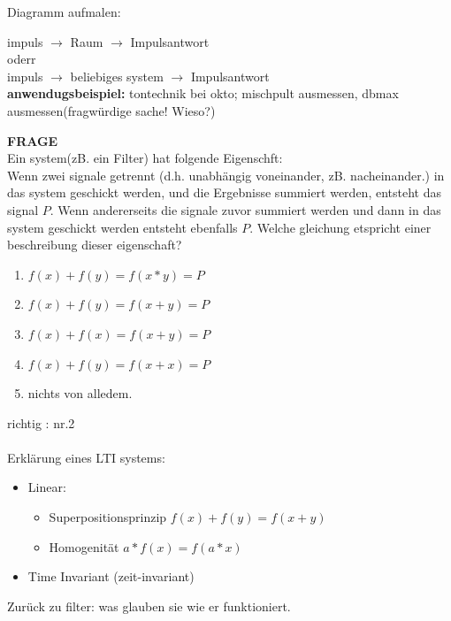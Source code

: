 Diagramm aufmalen:

impuls \(\rightarrow\) Raum \(\rightarrow\) Impulsantwort\\
oderr \\
impuls \(\rightarrow\) beliebiges system \(\rightarrow\) Impulsantwort\\
\textbf{anwendugsbeispiel:} tontechnik bei okto; mischpult ausmessen, dbmax ausmessen(fragwürdige sache! Wieso?)




\textbf{FRAGE}\\
Ein system(zB. ein Filter) hat folgende Eigenschft:\\
Wenn zwei signale getrennt (d.h. unabhängig voneinander, zB. nacheinander.) in das system geschickt werden, und die Ergebnisse summiert werden, entsteht das signal \(P\). Wenn andererseits die signale zuvor summiert werden und dann in das system geschickt werden entsteht ebenfalls \(P\). Welche gleichung etspricht einer beschreibung dieser eigenschaft?



\begin{enumerate}
	\item \(f(x)+f(y) = f (x * y) = P\)
	\item \(f(x)+f(y) = f (x + y) = P\)
	\item \(f(x)+f(x) = f (x + y) = P\)
	\item \(f(x)+f(y) = f (x + x) = P\)
	\item nichts von alledem.
\end{enumerate}

\newpage
richtig : nr.2 \\
\\

Erklärung eines LTI systems:

\begin{itemize}
	\item Linear:
		\begin{itemize}
			\item Superpositionsprinzip \(f(x)+f(y) = f (x + y)\)
			\item Homogenität \(a*f(x) = f(a*x)\) 
		\end{itemize}
	\item Time Invariant (zeit-invariant)
\end{itemize}


Zurück zu filter: 
was glauben sie wie er funktioniert. \\
\\

